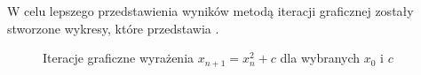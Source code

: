 \documentclass[11pt]{mk-polish-lab-report}
\begin{document}
\noindent W celu lepszego przedstawienia wyników metodą iteracji graficznej zostały stworzone wykresy, które przedstawia .

\begin{figure}[h]
\centering
{}\hfill
{}\hfill
{}\hfill
{}\hfill
\caption{Iteracje graficzne wyrażenia $x_{n+1}=x_n^2 + c$ dla wybranych $x_0$ i $c$}
\label{fig:zad6}
\end{figure}
\end{document}
